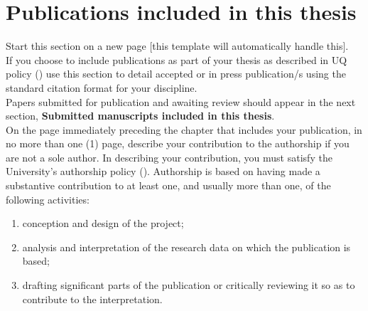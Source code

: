 


\section*{Publications included in this thesis}

\begin{instructional}

	Start this section on a new page [this template will automatically handle this].\\
	
	\noindent
	If you choose to include publications as part of your thesis as described in UQ policy (\href{https://ppl.app.uq.edu.au/content/4.60.08-higher-degree-research-examination#Guidelines}{\color{blue}{PPL 4.60.08 Higher Degree by Research Examination}}) use this section to detail accepted or in press publication/s using the standard citation format for your discipline. \\
    
    \noindent
	Papers submitted for publication and awaiting review should appear in the next section, \textbf{Submitted manuscripts included in this thesis}.\\
    
    \noindent
	On the page immediately preceding the chapter that includes your publication, in no more than one (1) page, describe your contribution to the authorship if you are not a sole author. In describing your contribution, you must satisfy the University's authorship policy (\href{http://ppl.app.uq.edu.au/content/4.20.04-authorship}{\color{blue}{PPL 4.20.04 Authorship}}). Authorship is based on having made a substantive contribution to at least one, and usually more than one, of the following activities:
	\begin{enumerate}
		\item	conception and design of the project;
		\item	analysis and interpretation of the research data on which the publication is based;
		\item	drafting significant parts of the publication or critically reviewing it so as to contribute to the interpretation.
	\end{enumerate}
	

\end{instructional}
